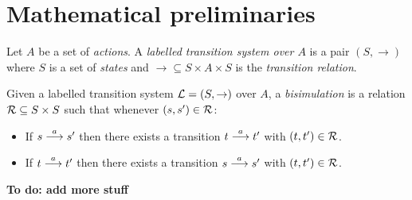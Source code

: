 \section{Mathematical preliminaries}\label{preliminaries}

\begin{definition}
Let $A$ be a set of \emph{actions}.  A \emph{labelled transition
  system over $A$} is a pair $(S, \rightarrow)$ where $S$ is a set of
\emph{states} and $\rightarrow \subseteq S \times A \times S$ is the
\emph{transition relation}.
\end{definition}

\begin{definition}
Given a labelled transition system $\mathcal{L} = (S, \rightarrow)$ over $A$,
a \emph{bisimulation} is a relation $\mathcal{R} \subseteq S \times S$ such
that whenever $(s, s') \in \mathcal{R}$:
\begin{itemize}

\item If $s \stackrel{a}{\longrightarrow} s'$ then there exists a transition $t \stackrel{a}{\longrightarrow} t'$ with $(t, t') \in \mathcal{R}$.

\item If $t \stackrel{a}{\longrightarrow} t'$ then there exists a transition $s \stackrel{a}{\longrightarrow} s'$ with $(t, t') \in \mathcal{R}$.

\end{itemize}

\end{definition}

\NI \textbf{To do: add more stuff}
